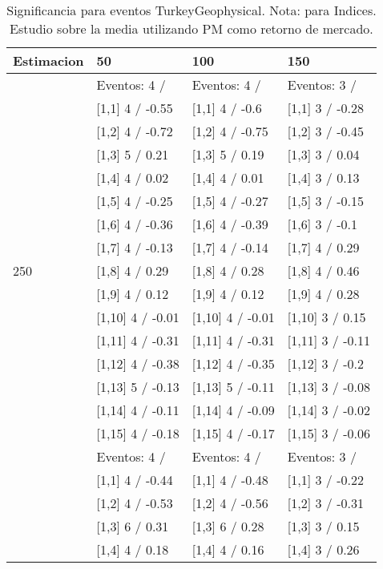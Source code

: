 \begin{table}

\caption{Significancia para eventos TurkeyGeophysical. Nota: para Indices. Estudio sobre la media utilizando PM como retorno de mercado.}
\centering
\begin{tabular}[t]{llll}
\toprule
Estimacion & 50 & 100 & 150\\
\midrule
 & Eventos:  4 / & Eventos:  4 / & Eventos:  3 /\\
 & {}[1,1] 4  / -0.55 & {}[1,1] 4  / -0.6 & {}[1,1] 3  / -0.28\\
 & {}[1,2] 4  / -0.72 & {}[1,2] 4  / -0.75 & {}[1,2] 3  / -0.45\\
 & {}[1,3] 5  / 0.21 & {}[1,3] 5  / 0.19 & {}[1,3] 3  / 0.04\\
 & {}[1,4] 4  / 0.02 & {}[1,4] 4  / 0.01 & {}[1,4] 3  / 0.13\\
\addlinespace
 & {}[1,5] 4  / -0.25 & {}[1,5] 4  / -0.27 & {}[1,5] 3  / -0.15\\
 & {}[1,6] 4  / -0.36 & {}[1,6] 4  / -0.39 & {}[1,6] 3  / -0.1\\
 & {}[1,7] 4  / -0.13 & {}[1,7] 4  / -0.14 & {}[1,7] 4  / 0.29\\
250 & {}[1,8] 4  / 0.29 & {}[1,8] 4  / 0.28 & {}[1,8] 4  / 0.46\\
 & {}[1,9] 4  / 0.12 & {}[1,9] 4  / 0.12 & {}[1,9] 4  / 0.28\\
\addlinespace
 & {}[1,10] 4  / -0.01 & {}[1,10] 4  / -0.01 & {}[1,10] 3  / 0.15\\
 & {}[1,11] 4  / -0.31 & {}[1,11] 4  / -0.31 & {}[1,11] 3  / -0.11\\
 & {}[1,12] 4  / -0.38 & {}[1,12] 4  / -0.35 & {}[1,12] 3  / -0.2\\
 & {}[1,13] 5  / -0.13 & {}[1,13] 5  / -0.11 & {}[1,13] 3  / -0.08\\
 & {}[1,14] 4  / -0.11 & {}[1,14] 4  / -0.09 & {}[1,14] 3  / -0.02\\
\addlinespace
 & {}[1,15] 4  / -0.18 & {}[1,15] 4  / -0.17 & {}[1,15] 3  / -0.06\\
 & Eventos:  4 / & Eventos:  4 / & Eventos:  3 /\\
 & {}[1,1] 4  / -0.44 & {}[1,1] 4  / -0.48 & {}[1,1] 3  / -0.22\\
 & {}[1,2] 4  / -0.53 & {}[1,2] 4  / -0.56 & {}[1,2] 3  / -0.31\\
 & {}[1,3] 6  / 0.31 & {}[1,3] 6  / 0.28 & {}[1,3] 3  / 0.15\\
\addlinespace
 & {}[1,4] 4  / 0.18 & {}[1,4] 4  / 0.16 & {}[1,4] 3  / 0.26\\

\end{tabular}
\end{table}
